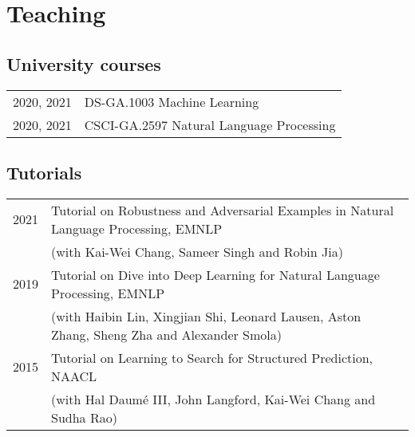 \documentclass[a4paper,11pt]{article}
\begin{document}
\section{Teaching} 
\subsection{University courses}
\begin{tabular}{rl}
2020, 2021 & DS-GA.1003 Machine Learning \\
    2020, 2021 & CSCI-GA.2597 Natural Language Processing
\end{tabular}

\subsection{Tutorials}
\begin{tabular}{rl}
    2021 & Tutorial on Robustness and Adversarial Examples in Natural Language Processing, EMNLP\\
         & (with Kai-Wei Chang, Sameer Singh and Robin Jia) \\
    2019 & Tutorial on Dive into Deep Learning for Natural Language Processing, EMNLP \\
         & (with Haibin Lin, Xingjian Shi, Leonard Lausen, Aston Zhang, Sheng Zha and Alexander Smola) \\
    2015 & Tutorial on Learning to Search for Structured Prediction, NAACL \\
         & (with Hal Daum\'e III, John Langford, Kai-Wei Chang and Sudha Rao)
\end{tabular}
\end{document}

